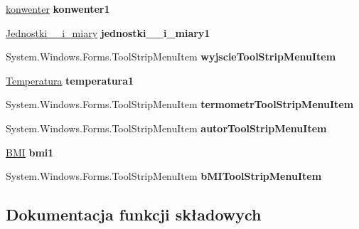 \begin{DoxyCompactItemize}
\mbox{\hyperlink{classkalku__all__in__one_1_1konwenter}{konwenter}} {\bfseries konwenter1}
\item 
\mbox{\label{classkalku__all__in__one_1_1_form1_a38b3d8730296314bc314ae9f42160d2e}} 
\mbox{\hyperlink{classkalku__all__in__one_1_1_jednostki____i__miary}{Jednostki\+\_\+\+\_\+i\+\_\+miary}} {\bfseries jednostki\+\_\+\+\_\+i\+\_\+miary1}
\item 
\mbox{\label{classkalku__all__in__one_1_1_form1_a1f070e96be70041e152e141d2b8eb329}} 
System.\+Windows.\+Forms.\+Tool\+Strip\+Menu\+Item {\bfseries wyjscie\+Tool\+Strip\+Menu\+Item}
\item 
\mbox{\label{classkalku__all__in__one_1_1_form1_a6539e28efab0c03855b5a0141d44b51a}} 
\mbox{\hyperlink{classkalku__all__in__one_1_1_temperatura}{Temperatura}} {\bfseries temperatura1}
\item 
\mbox{\label{classkalku__all__in__one_1_1_form1_a79d4c40e9c188c5e6aa47b8713d70d3b}} 
System.\+Windows.\+Forms.\+Tool\+Strip\+Menu\+Item {\bfseries termometr\+Tool\+Strip\+Menu\+Item}
\item 
\mbox{\label{classkalku__all__in__one_1_1_form1_a92931a79050871744ca0457ae3160c0d}} 
System.\+Windows.\+Forms.\+Tool\+Strip\+Menu\+Item {\bfseries autor\+Tool\+Strip\+Menu\+Item}
\item 
\mbox{\label{classkalku__all__in__one_1_1_form1_a74fffd7c444992f529caf65d546a6cf1}} 
\mbox{\hyperlink{classkalku__all__in__one_1_1_b_m_i}{B\+MI}} {\bfseries bmi1}
\item 
\mbox{\label{classkalku__all__in__one_1_1_form1_a9a944929e7acb3176e3b85540d30769f}} 
System.\+Windows.\+Forms.\+Tool\+Strip\+Menu\+Item {\bfseries b\+M\+I\+Tool\+Strip\+Menu\+Item}
\end{DoxyCompactItemize}


\subsection{Dokumentacja funkcji składowych}
\mbox{\label{classkalku__all__in__one_1_1_form1_a4bd45197a52ffd3416ed40e537314dd7}} 
